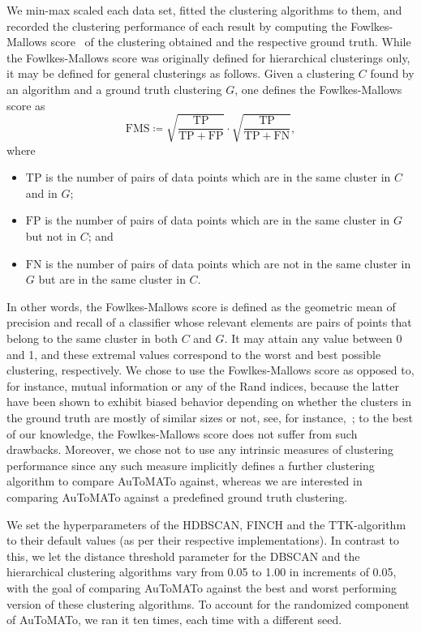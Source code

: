 \documentclass[10pt]{article} %
\theoremstyle{plain}
\newcommand{\aut}{AuToMATo\xspace}
\begin{document}
We min-max scaled each data set, fitted the clustering algorithms to them, and recorded the clustering performance of each result by computing the Fowlkes-Mallows score~\citep{fowlkes1983method} of the clustering obtained and the respective ground truth.
While the Fowlkes-Mallows score was originally defined for hierarchical clusterings only, it may be defined for general clusterings as follows. Given a clustering \(C\) found by an algorithm and a ground truth clustering \(G\), one defines the Fowlkes-Mallows score as \[
    \mathrm{FMS} \coloneqq \sqrt{\frac{\mathrm{TP}}{\mathrm{TP} + \mathrm{FP}}}\cdot\sqrt{\frac{\mathrm{TP}}{\mathrm{TP} + \mathrm{FN}}},
\]
where 
\begin{itemize}
    \item \(\mathrm{TP}\) is the number of pairs of data points which are in the same cluster in \(C\) and in \(G\);
    \item \(\mathrm{FP}\) is the number of pairs of data points which are in the same cluster in \(G\) but not in \(C\); and
    \item \(\mathrm{FN}\) is the number of pairs of data points which are not in the same cluster in \(G\) but are in the same cluster in \(C\).
\end{itemize}
In other words, the Fowlkes-Mallows score is defined as the geometric mean of precision and recall of a classifier whose relevant elements are pairs of points that belong to the same cluster in both \(C\) and \(G\). It may attain any value between 0 and 1, and these extremal values correspond to the worst and best possible clustering, respectively.
We chose to use the Fowlkes-Mallows score as opposed to, for instance, mutual information or any of the Rand indices, because the latter have been shown to exhibit biased behavior depending on whether the clusters in the ground truth are mostly of similar sizes or not, see, for instance,~\citet{adjusting_for_chance_romano}; to the best of our knowledge, the Fowlkes-Mallows score does not suffer from such drawbacks.
Moreover, we chose not to use any intrinsic measures of clustering performance since any such measure implicitly defines a further clustering algorithm to compare \aut against, whereas we are interested in comparing \aut against a predefined ground truth clustering.

We set the hyperparameters of the HDBSCAN, FINCH and the TTK-algorithm to their default values (as per their respective implementations). In contrast to this, we let the distance threshold parameter for the DBSCAN and the hierarchical clustering algorithms vary from 0.05 to 1.00 in increments of 0.05, with the goal of comparing \aut against the best and worst performing version of these clustering algorithms. To account for the randomized component of \aut, we ran it ten times, each time with a different seed.
\end{document}
